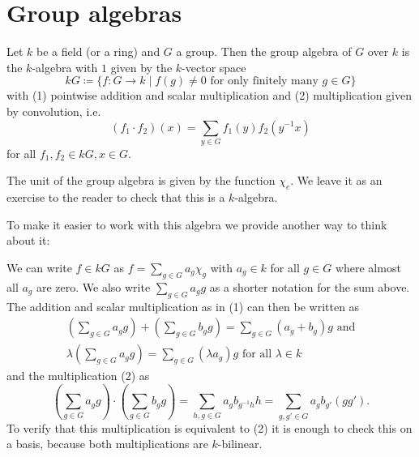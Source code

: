 \section{Group algebras}


\begin{defi}
 Let $k$ be a field (or a ring) and $G$ a group. Then the group algebra of $G$ over $k$ is the $k$-algebra with $1$ given by the $k$-vector space
 \[
  kG \coloneqq \{f \colon G \to k \mid f(g) \neq 0 \text{ for only finitely many } g \in G\}
 \]
 with (1) pointwise addition and scalar multiplication and (2) multiplication given by convolution, i.e.\
 \[
  (f_1 \cdot f_2)(x) = \sum_{y \in G} f_1(y) f_2\left(y^{-1}x\right)
 \]
 for all $f_1, f_2 \in kG, x \in G$.
\end{defi}

The unit of the group algebra is given by the function $\chi_e$. We leave it as an exercise to the reader to check that this is a $k$-algebra.

To make it easier to work with this algebra we provide another way to think about it:

We can write $f \in kG$ as $f = \sum_{g \in G} a_g \chi_g$ with $a_g \in k$ for all $g \in G$ where almost all $a_g$ are zero. We also write $\sum_{g \in G} a_g g$ as a shorter notation for the sum above. The addition and scalar multiplication as in (1) can then be written as
\begin{gather*}
 \left( \sum_{g \in G} a_g g \right) + \left( \sum_{g \in G} b_g g \right) = \sum_{g \in G} (a_g+b_g) g \text{ and}\\
 \lambda \left( \sum_{g \in G} a_g g \right) = \sum_{g \in G} (\lambda a_g) g \text{ for all } \lambda \in k
\end{gather*}
and the multiplication (2) as
\[
 \left( \sum_{g \in G} a_g g \right) \cdot \left( \sum_{g \in G} b_g g \right)
 = \sum_{h, g \in G} a_g b_{g^{-1}h} h
 = \sum_{g, g' \in G} a_g b_{g'} (g g').
\]
To verify that this multiplication is equivalent to (2) it is enough to check this on a basis, because both multiplications are $k$-bilinear.


